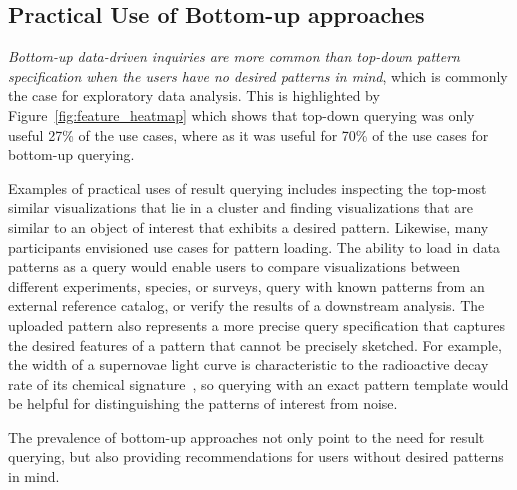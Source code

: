\subsection{Practical Use of Bottom-up approaches}
\par \emph{Bottom-up data-driven inquiries are more common than top-down pattern specification when the users have no desired patterns in mind}, which is commonly the case for exploratory data analysis. This is highlighted by Figure~\ref{fig:feature_heatmap} which shows that top-down querying was only useful 27\% of the use cases, where as it was useful for 70\% of the use cases for bottom-up querying.
\par Examples of practical uses of result querying includes inspecting the top-most similar visualizations that lie in a cluster and finding visualizations that are similar to an object of interest that exhibits a desired pattern. Likewise, many participants envisioned use cases for pattern loading. The ability to load in data patterns as a query would enable users to compare visualizations between different experiments, species, or surveys, query with known patterns from an external reference catalog, or verify the results of a downstream analysis. The uploaded pattern also represents a more precise query specification that captures the desired features of a pattern that cannot be precisely sketched. For example, the width of a supernovae light curve is characteristic to the radioactive decay rate of its chemical signature~\cite{Nugent1997}, so querying with an exact pattern template would be helpful for distinguishing the patterns of interest from noise.
\par The prevalence of bottom-up approaches not only point to the need for result querying, but also providing recommendations for users without desired patterns in mind. %
